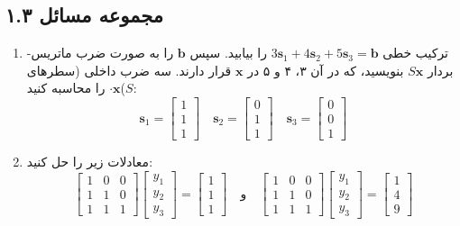 \documentclass[12pt, a4paper]{book}
\begin{document}
	\subsection*{مجموعه مسائل ۱.۳}
	\begin{enumerate}
		\item ترکیب خطی $3\mathbf{s}_1 + 4\mathbf{s}_2 + 5\mathbf{s}_3 = \mathbf{b}$ را بیابید. سپس $\mathbf{b}$ را به صورت ضرب ماتریس-بردار $S\mathbf{x}$ بنویسید، که در آن ۳، ۴ و ۵ در $\mathbf{x}$ قرار دارند. سه ضرب داخلی (سطرهای $S$)$\cdot \mathbf{x}$ را محاسبه کنید:
		\[ \mathbf{s}_1 = \begin{bmatrix} 1 \\ 1 \\ 1 \end{bmatrix} \quad \mathbf{s}_2 = \begin{bmatrix} 0 \\ 1 \\ 1 \end{bmatrix} \quad \mathbf{s}_3 = \begin{bmatrix} 0 \\ 0 \\ 1 \end{bmatrix} \]
		\item معادلات زیر را حل کنید:
		\[ \begin{bmatrix} 1 & 0 & 0 \\ 1 & 1 & 0 \\ 1 & 1 & 1 \end{bmatrix} \begin{bmatrix} y_1 \\ y_2 \\ y_3 \end{bmatrix} = \begin{bmatrix} 1 \\ 1 \\ 1 \end{bmatrix} \quad \text{و} \quad \begin{bmatrix} 1 & 0 & 0 \\ 1 & 1 & 0 \\ 1 & 1 & 1 \end{bmatrix} \begin{bmatrix} y_1 \\ y_2 \\ y_3 \end{bmatrix} = \begin{bmatrix} 1 \\ 4 \\ 9 \end{bmatrix} \]

\end{enumerate}
\end{document}
